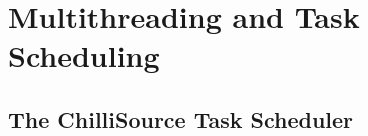 \section{Multithreading and Task Scheduling}\label{sec:observe_threads}

\subsection{The ChilliSource Task Scheduler}\label{ssec:observe_threads_scheduler}


